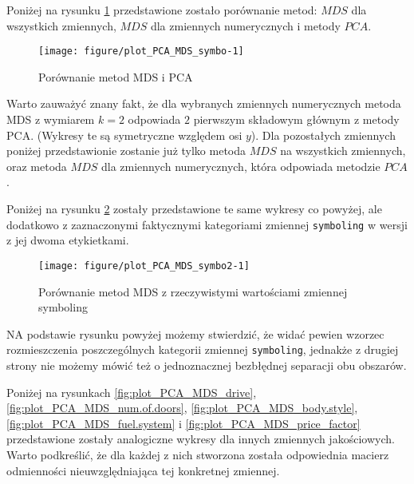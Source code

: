 \documentclass[12pt, a4paper]{article}\usepackage[]{graphicx}\usepackage[]{xcolor}
\makeatletter
\def\maxwidth{ %
  \ifdim\Gin@nat@width>\linewidth
    \linewidth
  \else
    \Gin@nat@width
  \fi
}
\newenvironment{knitrout}{}{} %
\makeatother
\begin{document}
Poniżej na rysunku \ref{fig:plot_PCA_MDS_symbo} przedstawione zostało porównanie metod: $MDS$ dla wszystkich zmiennych, $MDS$ dla zmiennych numerycznych i metody $PCA$. 

\begin{knitrout}
\color{fgcolor}\begin{figure}[H]

{\centering \texttt{[image: figure/plot\_PCA\_MDS\_symbo-1]} 

}

\caption[Porównanie metod MDS i PCA]{Porównanie metod MDS i PCA}\label{fig:plot_PCA_MDS_symbo}
\end{figure}

\end{knitrout}

Warto zauważyć znany fakt, że dla wybranych zmiennych numerycznych metoda MDS z wymiarem $k=2$ odpowiada $2$ pierwszym składowym głównym z metody PCA. (Wykresy te są symetryczne względem osi $y$). Dla pozostałych zmiennych poniżej przedstawionie zostanie już tylko metoda $MDS$ na wszystkich zmiennych, oraz metoda $MDS$ dla zmiennych numerycznych, która odpowiada metodzie $PCA$.
\par Poniżej na rysunku \ref{fig:plot_PCA_MDS_symbo2} zostały przedstawione te same wykresy co powyżej, ale dodatkowo z zaznaczonymi faktycznymi kategoriami zmiennej \texttt{symboling} w wersji z jej dwoma etykietkami.

\begin{knitrout}
\color{fgcolor}\begin{figure}[H]

{\centering \texttt{[image: figure/plot\_PCA\_MDS\_symbo2-1]} 

}

\caption[Porównanie metod MDS z rzeczywistymi wartościami zmiennej symboling]{Porównanie metod MDS z rzeczywistymi wartościami zmiennej symboling}\label{fig:plot_PCA_MDS_symbo2}
\end{figure}

\end{knitrout}

NA podstawie rysunku powyżej możemy stwierdzić, że widać pewien wzorzec rozmieszczenia poszczególnych kategorii zmiennej \texttt{symboling}, jednakże z drugiej strony nie możemy mówić też o jednoznacznej bezbłędnej separacji obu obszarów.

\par Poniżej na rysunkach \ref{fig:plot_PCA_MDS_drive}, \ref{fig:plot_PCA_MDS_num.of.doors}, \ref{fig:plot_PCA_MDS_body.style}, \ref{fig:plot_PCA_MDS_fuel.system} i \ref{fig:plot_PCA_MDS_price_factor} przedstawione zostały analogiczne wykresy dla innych zmiennych jakościowych. Warto podkreślić, że dla każdej z nich stworzona została odpowiednia macierz odmienności nieuwzględniająca tej konkretnej zmiennej.
\end{document}
